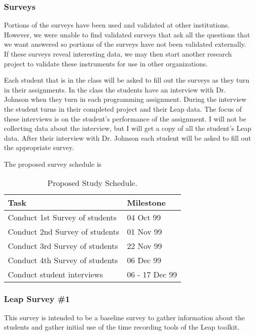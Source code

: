 \subsubsection{Surveys}

Portions of the surveys have been used and validated at other institutions.
However, we were unable to find validated surveys that ask all the questions
that we want answered so portions of the surveys have not been validated
externally.  If these surveys reveal interesting data, we may then start
another research project to validate these instruments for use in other
organizations. 

Each student that is in the class will be asked to fill out the surveys as they 
turn in their assignments.  In the class the students have an interview with
Dr. Johnson when they turn in each programming assignment.  During the
interview the student turns in their completed project and their Leap data.
The focus of these interviews is on the student's performance of the
assignment. I will not be collecting data about the interview, but I will get a 
copy of all the student's Leap data.  After their interview with Dr. Johnson
each student will be asked to fill out the appropriate survey.

The proposed survey schedule is
\begin{center}
  \begin{table}[htbp]
    \caption{Proposed Study Schedule.}  
    \begin{tabular}{|l|l|} \hline
      {\bf Task}&{\bf Milestone} \\ \hline
      Conduct 1st Survey of students & 04 Oct 99 \\ \hline
      Conduct 2nd Survey of students & 01 Nov 99 \\ \hline
      Conduct 3rd Survey of students & 22 Nov 99 \\ \hline
      Conduct 4th Survey of students & 06 Dec 99 \\ \hline
      Conduct student interviews & 06 - 17 Dec 99 \\ \hline
    \end{tabular}
  \end{table}
\end{center}



\subsubsection{Leap Survey \#1}
\label{area1}
This survey is intended to be a baseline survey to gather information about the 
students and gather initial use of the time recording tools of the Leap toolkit.

